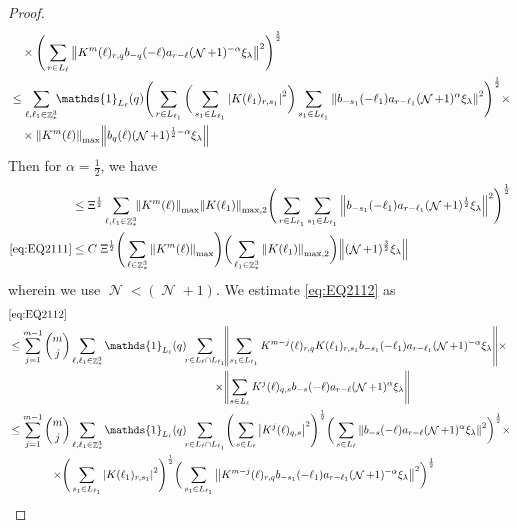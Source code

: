 \documentclass[12pt,a4paper]{article}
\numberwithin{equation}{section}
\newcommand{\1}{\mathbb{I}}
\DeclareMathOperator{\Z}{\mathbb{Z}}
\DeclareMathOperator{\NN}{\mathcal{N}}
\newcommand{\half}{\frac{1}{2}}
\theoremstyle{plain}
\theoremstyle{definition}
\theoremstyle{remark}
\theoremstyle{plain}
\theoremstyle{definition}
\theoremstyle{remark}
\begin{document}
\begin{proof}
\begin{align}
 	&\quad \times \Bigg( \sum\limits_{r \in L_\ell}  \norm{  K^{m}(\ell)_{r,q}  b_{-q}(-\ell) a_{r-\ell} (\NN+1)^{-\alpha}\xi_\lambda }^2\Bigg)^\half \nonumber\\
 	&\leq \sum\limits_{\ell,\ell_1 \in \Z^3_*} \!\!\mathds{1}_{L_\ell}(q) \Bigg( \sum\limits_{r \in L_{\ell_1}} \bigg( \sum\limits_{s_1 \in L_{\ell_1}}\abs{K(\ell_1)_{r,s_1}}^2\bigg) \sum\limits_{s_1 \in L_{\ell_1}} \norm{ b_{-s_1}(-\ell_1)  a_{r-\ell_1} (\NN+1)^{\alpha}\xi_\lambda}^2\Bigg)^\half \times\nonumber\\
 	&\quad \times  \norm{  K^{m}(\ell)}_{\max} \norm{b_{q}(\ell) (\NN+1)^{\half-\alpha}\xi_\lambda } \nonumber\\
\end{align}
	Then for $\alpha = \half$, we have 
\begin{align}
 	&\leq \Xi^\half \sum\limits_{\ell,\ell_1 \in \Z^3_*} \!\! \norm{ K^{m}(\ell)}_{\max} \norm{K(\ell_1)}_{\mathrm{max,2}}  \Bigg( \sum\limits_{r \in L_{\ell_1}} \sum\limits_{s_1 \in L_{\ell_1}} \norm{ b_{-s_1}(-\ell_1)  a_{r-\ell_1} (\NN+1)^{\half}\xi_\lambda}^2\Bigg)^\half \nonumber\\
 	\eqref{eq:EQ2111}&\leq C\; \Xi^\half \Bigg(\sum\limits_{\ell \in \Z^3_*}  \norm{  K^{m}(\ell)}_{\max}\Bigg) \bigg(\sum\limits_{\ell_1 \in \Z^3_*} \norm{K(\ell_1)}_{\mathrm{max,2}} \bigg) \norm{ (\NN+1)^{\frac{3}{2}}\xi_\lambda}  \label{eq:estEQ2111} 
 \end{align}
 wherein we use $\NN<(\NN+1)$. We estimate \eqref{eq:EQ2112} as 
  \begin{alignat}{2}
  	&\eqref{eq:EQ2112}\nonumber\\
  	&\leq \sum\limits_{j=1}^{m-1} {{m}\choose j} \sum\limits_{\ell, \ell_1\in \Z^3_*} \mathds{1}_{L_{\ell}}(q)\!\! \begin{aligned}[t]
  	\sum\limits_{r\in L_{\ell} \cap L_{\ell_1}}\! &\norm{  \sum\limits_{s_1 \in L_{\ell_1}} K^{m-j}(\ell)_{r,q} K(\ell_1)_{r,s_1} b_{-s_1}(-\ell_1) a_{r-\ell_1} (\NN+1)^{-\alpha}\xi_\lambda}\times\nonumber \\\times &\norm{\sum\limits_{s \in L_\ell} K^{j}(\ell)_{q,s}  b_{-s}(-\ell)  a_{r-\ell} (\NN+1)^{\alpha}\xi_\lambda }
  	\end{aligned} \nonumber\\
    &\leq \sum\limits_{j=1}^{m-1} \begin{aligned}[t] {{m}\choose j} &\sum\limits_{\ell, \ell_1\in \Z^3_*} \mathds{1}_{L_{\ell}}(q)\!\! 
    \sum\limits_{r\in L_{\ell} \cap L_{\ell_1}}\! \Bigg( \sum\limits_{s \in L_\ell} \abs{K^{j}(\ell)_{q,s}}^2\Bigg)^\half \bigg( \sum\limits_{s \in L_\ell}\norm{  b_{-s}(-\ell) a_{r-\ell} (\NN+1)^{\alpha}\xi_\lambda}^2\bigg)^\half \times\nonumber\\ \times \Bigg( &\sum\limits_{s_1 \in L_{\ell_1}}\abs{K(\ell_1)_{r,s_1}}^2\Bigg)^\half \bigg(\sum\limits_{s_1 \in L_{\ell_1}}\norm{ K^{m-j}(\ell)_{r,q}  b_{-s_1}(-\ell_1)  a_{r-\ell_1} (\NN+1)^{-\alpha}\xi_\lambda }^2\bigg)^\half

\end{aligned}
\end{alignat}
\end{proof}
\end{document}
